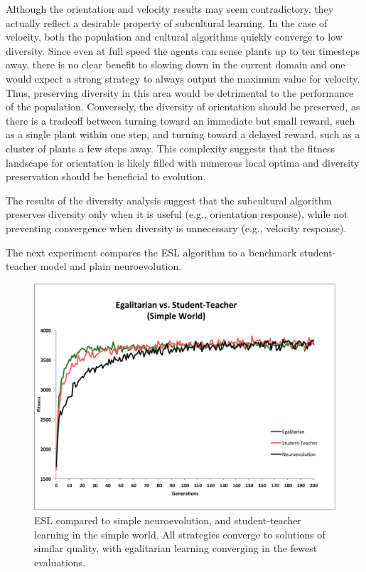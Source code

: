 \documentclass{sig-alternate}
\begin{document}
Although the orientation and velocity results may seem contradictory, they actually reflect a desirable property of subcultural learning. In the case of velocity, both the population and cultural algorithms quickly converge to low diversity. Since even at full speed the agents can sense plants up to ten timesteps away, there is no clear benefit to slowing down in the current domain and one would expect a strong strategy to always output the maximum value for velocity. Thus, preserving diversity in this area would be detrimental to the performance of the population. Conversely, the diversity of orientation should be preserved, as there is a tradeoff between turning toward an immediate but small reward, such as a single plant within one step, and turning toward a delayed reward, such as a cluster of plants a few steps away. This complexity suggests that the fitness landscape for orientation  is likely filled with numerous local optima and diversity preservation should be beneficial to evolution. 

The results of the diversity analysis suggest that the subcultural algorithm preserves diversity only when it is useful (e.g., orientation response), while not preventing convergence when diversity is unnecessary (e.g., velocity response).

The next experiment compares the ESL algorithm to a benchmark student-teacher model and plain neuroevolution.

\begin{figure}[t]
  \centering
    \includegraphics[scale=.41]{egalitarian_vs_student_teacher_simple.pdf}
  \caption{ESL compared to simple neuroevolution, and student-teacher learning in the simple world. All strategies converge to solutions of similar quality, with egalitarian learning converging in the fewest evaluations.}
  \label{fig:reward-studentteacher-simple}
\end{figure}
\end{document}
